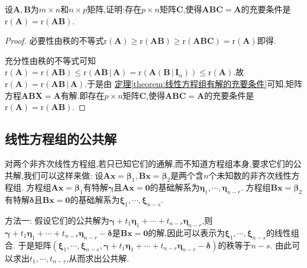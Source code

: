 \documentclass[../../main.tex]{subfiles}
\begin{document}
\begin{proposition}
设\(\boldsymbol{A},\boldsymbol{B}\)为\(m\times n\)和\(n\times p\)矩阵,证明:存在\(p\times n\)矩阵\(\boldsymbol{C}\),使得\(\boldsymbol{A}\boldsymbol{B}\boldsymbol{C}=\boldsymbol{A}\)的充要条件是\(\mathrm{r}(\boldsymbol{A})=\mathrm{r}(\boldsymbol{A}\boldsymbol{B})\).
\end{proposition}
\begin{proof}
必要性由秩的不等式\(\mathrm{r}(\boldsymbol{A})\geqslant \mathrm{r}(\boldsymbol{A}\boldsymbol{B})\geqslant \mathrm{r}(\boldsymbol{A}\boldsymbol{B}\boldsymbol{C})=\mathrm{r}(\boldsymbol{A})\)即得. 

充分性由秩的不等式可知\(\mathrm{r}\left( \boldsymbol{A} \right) =\mathrm{r}\left( \boldsymbol{AB} \right) \le \mathrm{r}\left( \boldsymbol{AB}\,|\,\boldsymbol{A} \right) =\mathrm{r}\left( \boldsymbol{A}\left( \boldsymbol{B}\,|\,\boldsymbol{I}_n \right) \right) \le \mathrm{r}\left( \boldsymbol{A} \right)\).故$\mathrm{r}\left( \boldsymbol{A} \right) =\mathrm{r}\left( \boldsymbol{AB}\,|\,\boldsymbol{A} \right)$.于是由
\hyperref[theorem:线性方程组有解的充要条件]{定理\ref{theorem:线性方程组有解的充要条件}}可知,矩阵方程$\boldsymbol{ABX}=\boldsymbol{A}$有解.即存在\(p\times n\)矩阵\(\boldsymbol{C}\),使得\(\boldsymbol{A}\boldsymbol{B}\boldsymbol{C}=\boldsymbol{A}\)的充要条件是\(\mathrm{r}(\boldsymbol{A})=\mathrm{r}(\boldsymbol{A}\boldsymbol{B})\).
\end{proof}

\subsection{线性方程组的公共解}

对两个非齐次线性方程组,若只已知它们的通解,而不知道方程组本身,要求它们的公共解,我们可以这样来做:
设\(\boldsymbol{A}\boldsymbol{x}=\boldsymbol{\beta}_1,\boldsymbol{B}\boldsymbol{x}=\boldsymbol{\beta}_2\)是两个含\(n\)个未知数的非齐次线性方程组. 方程组\(\boldsymbol{A}\boldsymbol{x}=\boldsymbol{\beta}_1\)有特解\(\boldsymbol{\gamma}\)且\(\boldsymbol{A}\boldsymbol{x}=\boldsymbol{0}\)的基础解系为\(\boldsymbol{\eta}_1,\cdots,\boldsymbol{\eta}_{n - r}\). 方程组\(\boldsymbol{B}\boldsymbol{x}=\boldsymbol{\beta}_2\)有特解\(\boldsymbol{\delta}\)且\(\boldsymbol{B}\boldsymbol{x}=\boldsymbol{0}\)的基础解系为\(\boldsymbol{\xi}_1,\cdots,\boldsymbol{\xi}_{n - s}\).

{\color{blue}方法一:} 假设它们的公共解为\(\boldsymbol{\gamma}+t_1\boldsymbol{\eta}_1+\cdots+t_{n - r}\boldsymbol{\eta}_{n - r}\),则\(\boldsymbol{\gamma}+t_1\boldsymbol{\eta}_1+\cdots+t_{n - r}\boldsymbol{\eta}_{n - r}-\boldsymbol{\delta}\)是\(\boldsymbol{B}\boldsymbol{x}=\boldsymbol{0}\)的解,因此可以表示为\(\boldsymbol{\xi}_1,\cdots,\boldsymbol{\xi}_{n - s}\)的线性组合. 于是矩阵\((\boldsymbol{\xi}_1,\cdots,\boldsymbol{\xi}_{n - s},\boldsymbol{\gamma}+t_1\boldsymbol{\eta}_1+\cdots+t_{n - r}\boldsymbol{\eta}_{n - r}-\boldsymbol{\delta})\)的秩等于\(n - s\). 由此可以求出\(t_1,\cdots,t_{n - r}\),从而求出公共解.
\end{document}
